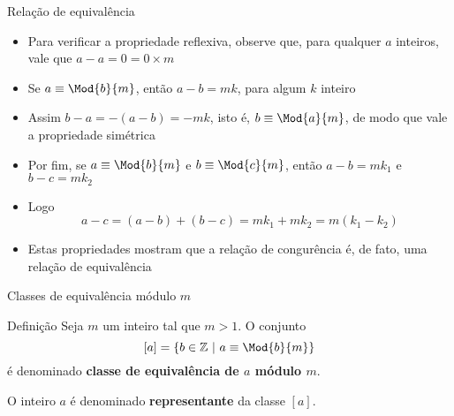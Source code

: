 \begin{frame}[fragile]{Relação de equivalência}

    \begin{itemize}
        \item Para verificar a propriedade reflexiva, observe que, para qualquer $a$ inteiros, vale
            que $a - a = 0 = 0\times m$

        \item Se $a\equiv \Mod{b}{m}$, então $a - b = mk$, para algum $k$ inteiro

        \item Assim $b - a = -(a - b) = -mk$, isto é, $b\equiv \Mod{a}{m}$, de modo que vale a 
            propriedade simétrica

        \item Por fim, se $a\equiv \Mod{b}{m}$ e $b\equiv \Mod{c}{m}$, então $a - b = mk_1$ e 
            $b - c = mk_2$

        \item Logo
        $$
            a - c = (a - b) + (b - c) = mk_1 + mk_2 = m(k_1 - k_2)
        $$

        \item Estas propriedades mostram que a relação de congurência é, de fato, uma relação de 
            equivalência 
    \end{itemize}

\end{frame}

\begin{frame}[fragile]{Classes de equivalência módulo $m$}

    \begin{block}{Definição}
        Seja $m$ um inteiro tal que $m > 1$. O conjunto
        $$
            [a] = \{ b\in\mathbb{Z}\ |\ a\equiv \Mod{b}{m}\}
        $$
        é denominado \textbf{classe de equivalência de $a$ módulo $m$}.

        O inteiro $a$ é denominado \textbf{representante} da classe $[a]$.
    \end{block}

\end{frame}

